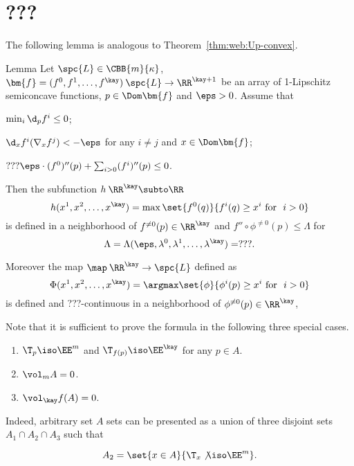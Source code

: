 \section{???}


The following lemma is analogous to Theorem~\ref{thm:web:Up-convex}.

\begin{thm}{Lemma}
Let $\spc{L}\in\CBB{m}{\kappa}$,
$\bm{f}=(f^0,f^1,\dots,f^\kay)\:\spc{L}\to \RR^{\kay+1}$
be an array of 1-Lipschitz semiconcave functions, 
$p\in\Dom\bm{f}$ and $\eps>0$.
Assume that 

\begin{subthm}{}
$\min_i\d_pf^i\le 0$;
\end{subthm}

\begin{subthm}{} $\d_xf^i(\nabla_xf^j)<-\eps$ for any $i\ne j$ and $x\in \Dom\bm{f}$;
\end{subthm}

\begin{subthm}{}
$???\eps\cdot(f^0)''(p)+\sum_{i>0}(f^i)''(p)\le 0$.
\end{subthm}
Then the subfunction $h\:\RR^\kay\subto\RR$
\[h(x^1,x^2,\dots,x^\kay)=\max\set{f^0(q)}{f^i(q)\ge x^i\ \text{for}\ \ i>0}\]
is defined in a neighborhood of $f^{\ne0}(p)\in\RR^\kay$
and $f''\circ\phi^{\ne0}(p)\le \Lambda$
for 
\[\Lambda=\Lambda(\eps,\lambda^0,\lambda^1,\dots,\lambda^\kay)=???.\]

Moreover the map $\map\:\RR^\kay\to\spc{L}$ defined as 
\[\Phi(x^1,x^2,\dots,x^\kay)
=
\argmax\set{\phi}{\phi^i(p)\ge x^i\ \text{for}\ \ i>0}\]
is defined and ???-continuous in a neighborhood of $\phi^{\ne0}(p)\in\RR^\kay$,

\end{thm}




Note that it is sufficient to prove the formula 
in the following three special cases.
\begin{enumerate}
\item\label{coarea:main-case} $\T_p\iso \EE^m$ and $\T_{f(p)}\iso \EE^\kay$ for any $p\in A$.
\item\label{coarea:case2} $\vol_mA=0$.
\item\label{coarea:case3} $\vol_\kay f(A)=0$.
\end{enumerate}
Indeed, arbitrary set $A$ sets
can be presented as a union of three disjoint sets 
$A_1\cap A_2\cap A_3$
such that

\[A_2=\set{x\in A}{\T_x\not\iso\EE^m}.\]


